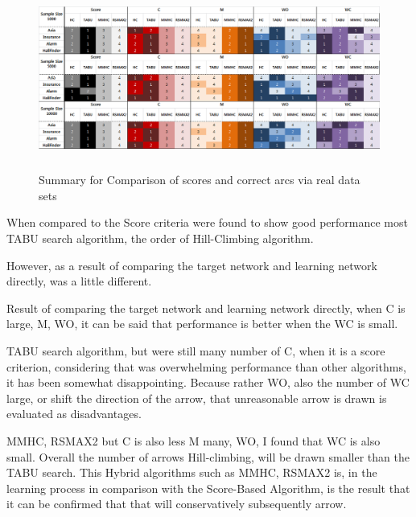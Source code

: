 	\begin{figure}[!h]
	\centering
		\includegraphics[height=170pt]{Real_Result}
		\caption{Summary for Comparison of scores and correct arcs via real data sets}
	\end{figure}	

When compared to the Score criteria were found to show good performance most TABU search algorithm, the order of Hill-Climbing algorithm.

However, as a result of comparing the target network and learning network directly, was a little different.

Result of comparing the target network and learning network directly, when C is large, M, WO, it can be said that performance is better when the WC is small.

TABU search algorithm, but were still many number of C, when it is a score criterion, considering that was overwhelming performance than other algorithms, it has been somewhat disappointing. Because rather WO, also the number of WC large, or shift the direction of the arrow, that unreasonable arrow is drawn is evaluated as disadvantages.

MMHC, RSMAX2 but C is also less M many, WO, I found that WC is also small. Overall the number of arrows Hill-climbing, will be drawn smaller than the TABU search. This Hybrid algorithms such as MMHC, RSMAX2 is, in the learning process in comparison with the Score-Based Algorithm, is the result that it can be confirmed that that will conservatively subsequently arrow.


